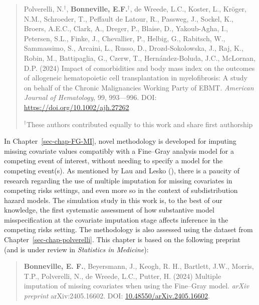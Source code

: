 \documentclass[
  letterpaper,
  paper=240mm:170mm,
  twoside=true,
  open=right,
  fontsize=10pt,
  pagesize=false,
  BCOR=15mm,
  DIV=14,
  headinclude=true,
  footinclude=false,
  headsepline=on]{scrbook}
\begin{document}
\begin{quote}
Polverelli, N.\(^\dagger\), \textbf{Bonneville, E.F.}\(^\dagger\), de
Wreede, L.C., Koster, L., Kröger, N.M., Schroeder, T., Peffault de
Latour, R., Passweg, J., Sockel, K., Broers, A.E.C., Clark, A., Dreger,
P., Blaise, D., Yakoub-Agha, I., Petersen, S.L., Finke, J., Chevallier,
P., Helbig, G., Rabitsch, W., Sammassimo, S., Arcaini, L., Russo, D.,
Drozd-Sokolowska, J., Raj, K., Robin, M., Battipaglia, G., Czerw, T.,
Hernández-Boluda, J.C., McLornan, D.P. (2024) Impact of comorbidities
and body mass index on the outcomes of allogeneic hematopoietic cell
transplantation in myelofibrosis: A study on behalf of the Chronic
Malignancies Working Party of EBMT. \emph{American Journal of
Hematology}, 99, 993---996. DOI: \url{https://doi.org/10.1002/ajh.27262}

\(^\dagger\)These authors contributed equally to this work and share
first authorship
\end{quote}

In Chapter~\ref{sec-chap-FG-MI}, novel methodology is developed for
imputing missing covariate values compatibly with a Fine--Gray analysis
model for a competing event of interest, without needing to specify a
model for the competing event(s). As mentioned by Lau and Lesko
(), there is a
paucity of research regarding the use of multiple imputation for missing
covariates in competing risks settings, and even more so in the context
of subdistribution hazard models. The simulation study in this work is,
to the best of our knowledge, the first systematic assessment of how
substantive model misspecification at the covariate imputation stage
affects inference in the competing risks setting. The methodology is
also assessed using the dataset from Chapter~\ref{sec-chap-polverelli}.
This chapter is based on the following preprint (and is under review in
\emph{Statistics in Medicine}):

\begin{quote}
\textbf{Bonneville, E. F.}, Beyersmann, J., Keogh, R. H., Bartlett,
J.W., Morris, T.P., Polverelli, N., de Wreede, L.C., Putter, H. (2024)
Multiple imputation of missing covariates when using the Fine--Gray
model. \emph{arXiv preprint} arXiv:2405.16602. DOI:
\href{https://doi.org/10.48550/arXiv.2405.16602}{10.48550/arXiv.2405.16602}.
\end{quote}
\end{document}
